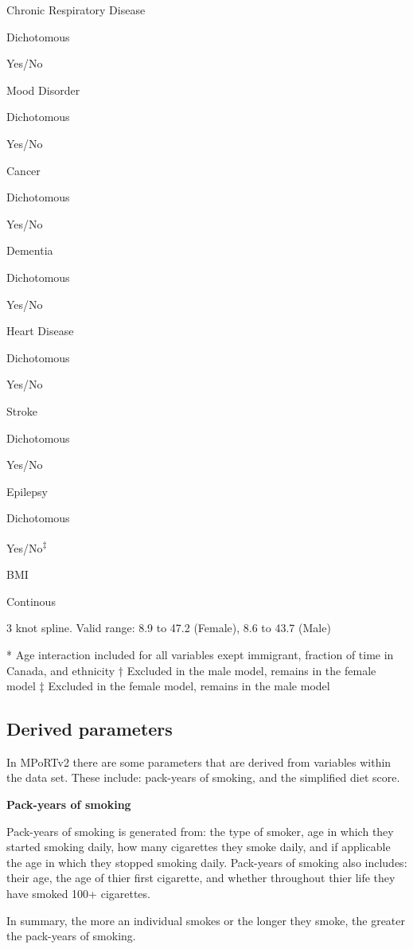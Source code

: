 \documentclass[]{book}
\begin{document}
Chronic Respiratory Disease

Dichotomous

Yes/No

Mood Disorder

Dichotomous

Yes/No

Cancer

Dichotomous

Yes/No

Dementia

Dichotomous

Yes/No

Heart Disease

Dichotomous

Yes/No

Stroke

Dichotomous

Yes/No

Epilepsy

Dichotomous

Yes/No\textsuperscript{‡}

BMI

Continous

3 knot spline. Valid range: 8.9 to 47.2 (Female), 8.6 to 43.7 (Male)

* Age interaction included for all variables exept immigrant, fraction of time in Canada, and ethnicity † Excluded in the male model, remains in the female model ‡ Excluded in the female model, remains in the male model

\hypertarget{derived-parameters}{%
\subsection{Derived parameters}\label{derived-parameters}}

In MPoRTv2 there are some parameters that are derived from variables within the data set. These include: pack-years of smoking, and the simplified diet score.

\textbf{Pack-years of smoking}

Pack-years of smoking is generated from: the type of smoker, age in which they started smoking daily, how many cigarettes they smoke daily, and if applicable the age in which they stopped smoking daily. Pack-years of smoking also includes: their age, the age of thier first cigarette, and whether throughout thier life they have smoked 100+ cigarettes.

In summary, the more an individual smokes or the longer they smoke, the greater the pack-years of smoking.
\end{document}
